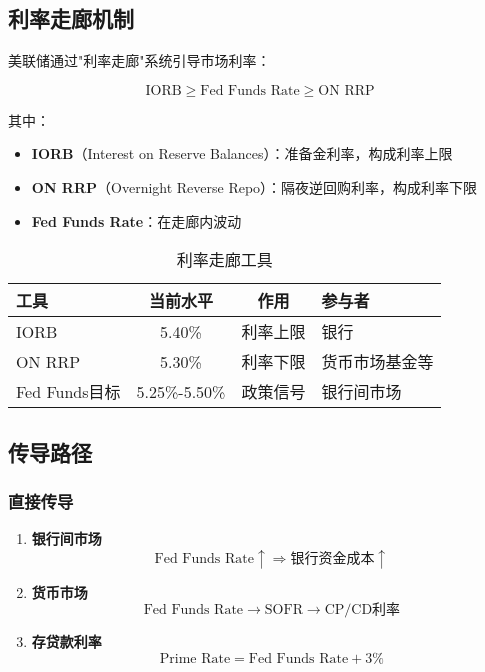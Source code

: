 \subsection{利率走廊机制}

美联储通过"利率走廊"系统引导市场利率：

\begin{equation}
\text{IORB} \geq \text{Fed Funds Rate} \geq \text{ON RRP}
\end{equation}

其中：
\begin{itemize}
    \item \textbf{IORB}（Interest on Reserve Balances）：准备金利率，构成利率上限
    \item \textbf{ON RRP}（Overnight Reverse Repo）：隔夜逆回购利率，构成利率下限
    \item \textbf{Fed Funds Rate}：在走廊内波动
\end{itemize}

\begin{table}[h]
\centering
\caption{利率走廊工具}
\begin{tabular}{|l|c|c|l|}
\hline
\textbf{工具} & \textbf{当前水平} & \textbf{作用} & \textbf{参与者} \\
\hline
IORB & 5.40\% & 利率上限 & 银行 \\
ON RRP & 5.30\% & 利率下限 & 货币市场基金等 \\
Fed Funds目标 & 5.25\%-5.50\% & 政策信号 & 银行间市场 \\
\hline
\end{tabular}
\end{table}

\subsection{传导路径}

\subsubsection{直接传导}

\begin{enumerate}
    \item \textbf{银行间市场}
    \begin{equation}
    \text{Fed Funds Rate} \uparrow \Rightarrow \text{银行资金成本} \uparrow
    \end{equation}
    
    \item \textbf{货币市场}
    \begin{equation}
    \text{Fed Funds Rate} \rightarrow \text{SOFR} \rightarrow \text{CP/CD利率}
    \end{equation}
    
    \item \textbf{存贷款利率}
    \begin{equation}
    \text{Prime Rate} = \text{Fed Funds Rate} + 3\%
    \end{equation}
\end{enumerate}

